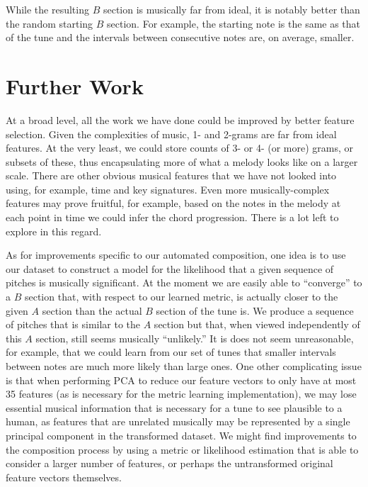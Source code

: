\documentclass{article} %
\begin{document}
While the resulting $B$ section is musically far from ideal, it is notably
better than the random starting $B$ section. For example, the starting note is
the same as that of the tune and the intervals between consecutive notes are, on
average, smaller.

\section{Further Work}
At a broad level, all the work we have done could be improved by better feature
selection. Given the complexities of music, 1- and 2-grams are far from ideal
features. At the very least, we could store counts of 3- or 4- (or more) grams,
or subsets of these, thus encapsulating more of what a melody looks like on a
larger scale. There are other obvious musical features that we have not looked
into using, for example, time and key signatures. Even more musically-complex
features may prove fruitful, for example, based on the notes in the melody at
each point in time we could infer the chord progression. There is a lot left
to explore in this regard.

As for improvements specific to our automated composition, one idea is to
use our dataset to construct a model for the likelihood that a given sequence
of pitches is musically significant. At the moment we are easily able to
``converge'' to a $B$ section that, with respect to our learned metric, is
actually closer to the given $A$ section than the actual $B$ section of the
tune is. We produce a sequence of pitches that is similar to the $A$ section
but that, when viewed independently of this $A$ section, still seems musically
``unlikely.'' It is does not seem unreasonable, for example, that we could
learn from our set of tunes that smaller intervals between notes are much more
likely than large ones. One other complicating issue is that when performing PCA
to reduce our feature vectors to only have at most 35 features (as is necessary
for the metric learning implementation), we may lose essential musical
information that is necessary for a tune to see plausible to a human, as
features that are unrelated musically may be represented by a single
principal component in the transformed dataset. We might find improvements to
the composition process by using a metric or likelihood estimation that is able
to consider a larger number of features, or perhaps the untransformed original
feature vectors themselves.

\end{document}

